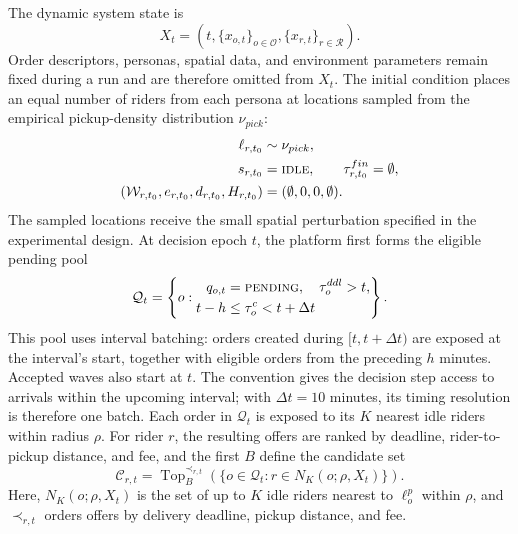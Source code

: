 \documentclass[letterpaper,journal]{IEEEtran}
\begin{document}
The dynamic system state is
\begin{equation}
X_t=\left(t,\{x_{o,t}\}_{o\in\mathcal{O}},
\{x_{r,t}\}_{r\in\mathcal{R}}\right).
\end{equation}
Order descriptors, personas, spatial data, and environment parameters remain fixed during a run and are therefore omitted from $X_t$. The initial condition places an equal number of riders from each persona at locations sampled from the empirical pickup-density distribution $\nu_{pick}$:
\begin{equation}
\begin{aligned}
\ell_{r,t_0}&\sim\nu_{pick},\\
s_{r,t_0}&=\textsc{idle},\qquad \tau_{r,t_0}^{fin}=\emptyset,\\
(\mathcal{W}_{r,t_0},e_{r,t_0},d_{r,t_0},H_{r,t_0})
&=(\emptyset,0,0,\emptyset).
\end{aligned}
\end{equation}
The sampled locations receive the small spatial perturbation specified in the experimental design. At decision epoch $t$, the platform first forms the eligible pending pool
\begin{equation}
\mathcal{Q}_t=\left\{o:
\begin{aligned}
q_{o,t}&=\textsc{pending},\quad \tau_o^{ddl}>t,\\
t-h&\leq\tau_o^c<t+\Delta t
\end{aligned}\right\}.
\end{equation}
This pool uses interval batching: orders created during $[t,t+\Delta t)$ are exposed at the interval's start, together with eligible orders from the preceding $h$ minutes. Accepted waves also start at $t$. The convention gives the decision step access to arrivals within the upcoming interval; with $\Delta t=10$ minutes, its timing resolution is therefore one batch. Each order in $\mathcal{Q}_t$ is exposed to its $K$ nearest idle riders within radius $\rho$. For rider $r$, the resulting offers are ranked by deadline, rider-to-pickup distance, and fee, and the first $B$ define the candidate set
\begin{equation}
\mathcal{C}_{r,t}=
\operatorname{Top}_{B}^{\prec_{r,t}}\!\left(
\{o\in\mathcal{Q}_t:r\in N_K(o;\rho,X_t)\}
\right).
\end{equation}
Here, $N_K(o;\rho,X_t)$ is the set of up to $K$ idle riders nearest to $\ell_o^p$ within $\rho$, and $\prec_{r,t}$ orders offers by delivery deadline, pickup distance, and fee.
\end{document}
